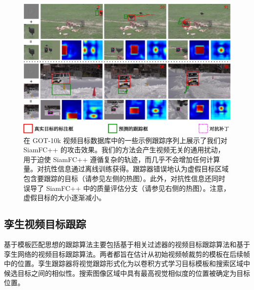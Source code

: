 \begin{figure}[t]
\centering
\includegraphics[width=1.0\textwidth]{Img/attack/1_v8.pdf}
\caption{在 GOT-10k 视频目标数据库中的一些示例跟踪序列上展示了我们对 SiamFC++ 的攻击效果。我们的方法会产生视频无关的通用扰动，用于迫使 SiamFC++ 遵循复杂的轨迹，而几乎不会增加任何计算量。对抗性信息通过离线训练获得。跟踪器错误地认为虚假目标区域包含要跟踪的目标（请参见左侧的热图）。此外，对抗性信息还同时误导了 SiamFC++ 中的质量评估分支（请参见右侧的热图）。注意，虚假目标的大小逐渐减小。} 
\label{fig:1}
\end{figure}

\subsection{孪生视频目标跟踪}

基于模板匹配思想的跟踪算法主要包括基于相关过滤器的视频目标跟踪算法和基于孪生网络的视频目标跟踪算法。两者都旨在估计从初始视频帧裁剪的模板在后续帧中的位置。孪生跟踪器将视觉跟踪形式化为以卷积方式学习目标模板和搜索区域中候选目标之间的相似性。搜索图像区域中具有最高视觉相似度的位置被确定为目标位置。

